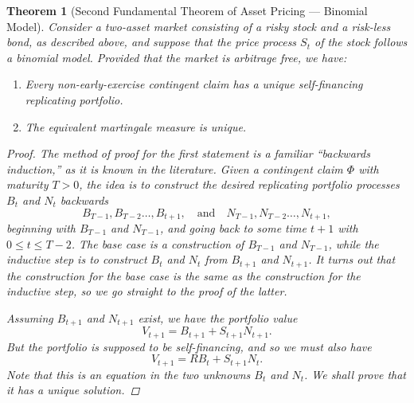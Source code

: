 \documentclass[11pt, openany, oneside]{book}
\newtheorem{thm}{Theorem}[section]
\theoremstyle{definition}
\theoremstyle{remark}
\theoremstyle{boldital}
\numberwithin{equation}{section}
\begin{document}
\begin{thm}[Second Fundamental Theorem of Asset Pricing --- Binomial Model]\label{thm:FTAP2-binomial}
Consider a two-asset market consisting of a risky stock and a risk-less bond, as described above, and suppose that the price process $S_t$ of the stock follows a binomial model. Provided that the market is arbitrage free, we have:
\begin{enumerate}
\item Every non-early-exercise contingent claim has a unique self-financing replicating portfolio.
\item The equivalent martingale measure is unique.
\end{enumerate}
\begin{proof}
The method of proof for the first statement is a familiar ``backwards induction,'' as it is known in the literature. Given a contingent claim $\Phi$ with maturity $T>0$, the idea is to construct the desired replicating portfolio processes $B_t$ and $N_t$ backwards
	\[
	B_{T-1},B_{T-2} \ldots, B_{t+1}, \quad \text{and} \quad N_{T-1},N_{T-2} \ldots, N_{t+1},
	\]
beginning with $B_{T-1}$ and $N_{T-1}$, and going back to some time $t+1$ with $0 \leq t \leq T-2$. The base case is a construction of $B_{T-1}$ and $N_{T-1}$, while the inductive step is to construct $B_t$ and $N_t$ from $B_{t+1}$ and $N_{t+1}$. It turns out that the construction for the base case is the same as the construction for the inductive step, so we go straight to the proof of the latter.

Assuming $B_{t+1}$ and $N_{t+1}$ exist, we have the portfolio value
	\[
	V_{t+1} = B_{t+1} + S_{t+1}N_{t+1}.
	\]
But the portfolio is supposed to be self-financing, and so we must also have
	\begin{equation}\label{eq:self-financing}
	V_{t+1} = R B_t + S_{t+1}N_t.
	\end{equation}
Note that this is an equation in the two unknowns $B_t$ and $N_t$. We shall prove that it has a unique solution.


\end{proof}
\end{thm}
\end{document}
